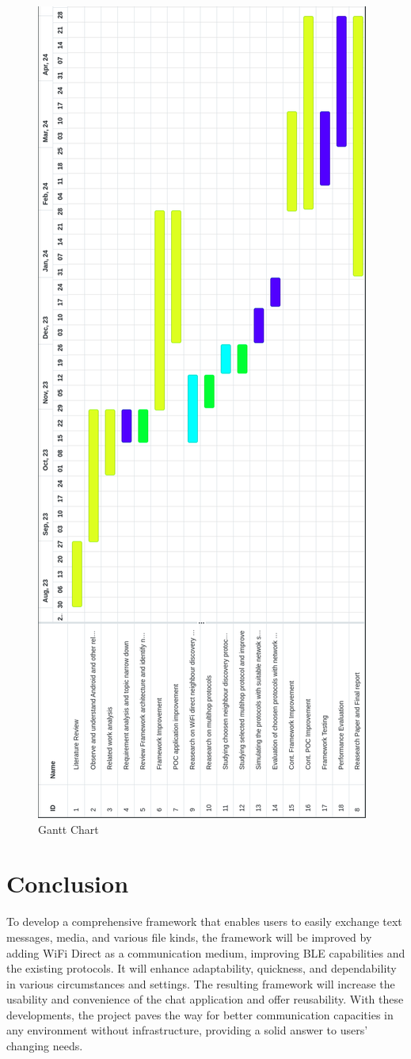 \documentclass[12pt, conference, onecolumn, a4paper]{IEEEtran}
\begin{document}
\begin{figure}[htbp]
    \centerline{\includegraphics[height=1.4\textwidth]{imgs/gantt.png}}
    \caption{Gantt Chart}
    \label{gantt}
\end{figure}

\newpage
\newpage

\section{Conclusion}

To develop a comprehensive framework that enables users to easily exchange text
messages, media, and various file kinds, the framework will be improved by
adding WiFi Direct as a communication medium, improving BLE capabilities and
the existing protocols. It will enhance adaptability, quickness, and
dependability in various circumstances and settings. The resulting framework
will increase the usability and convenience of the chat application and offer
reusability. With these developments, the project paves the way for better
communication capacities in any environment without infrastructure, providing a
solid answer to users' changing needs.
\end{document}

